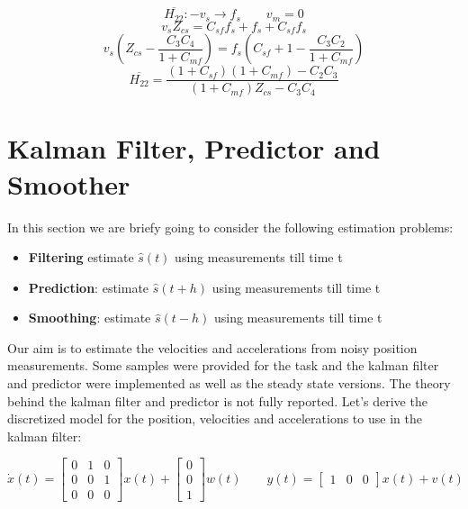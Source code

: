 \documentclass[a4paper,12pt]{article}
\begin{document}
\[
    \overline{H_{22}} : -v_s \rightarrow f_s \qquad v_m = 0
\]\[
    v_sZ_{cs} = C_{sf}f_s + f_s + C_{sf}f_s
\]\[
    v_s(Z_{cs}-\frac{C_3C_4}{1+C_{mf}}) = f_s(C_{sf} + 1 - \frac{C_3C_2}{1+C_{mf}})
\]\[
    \overline{H_{22}} = \frac{(1+C_{sf})(1+C_{mf})-C_2C_3}{(1+C_{mf})Z_{cs}-C_3C_4}
\]

\section{Kalman Filter, Predictor and Smoother}
In this section we are briefy going to consider the following estimation problems:
\begin{itemize}
    \item \textbf{Filtering} estimate $\hat{s}(t)$ using measurements till time t
    \item \textbf{Prediction}: estimate $\hat{s}(t+h)$ using measurements till time t
    \item \textbf{Smoothing}: estimate $\hat{s}(t-h)$ using measurements till time t
\end{itemize}
\bigskip

Our aim is to estimate the velocities and accelerations from noisy position measurements. Some samples were provided for the task and the kalman filter and predictor were implemented as well as the steady state versions. The theory behind the kalman filter and predictor is not fully reported. Let's derive the discretized model for the position, velocities and accelerations to use in the kalman filter:

\begin{equation}
    \dot{x}(t) =  \begin{bmatrix}  0&1&0 \\ 0&0&1\\0&0&0 \end{bmatrix} x(t) + \begin{bmatrix}  0\\0\\1 \end{bmatrix} w(t)
    \qquad
    y(t) = \begin{bmatrix}  1&0&0 \end{bmatrix}x(t) + v(t)
\end{equation}
\end{document}
